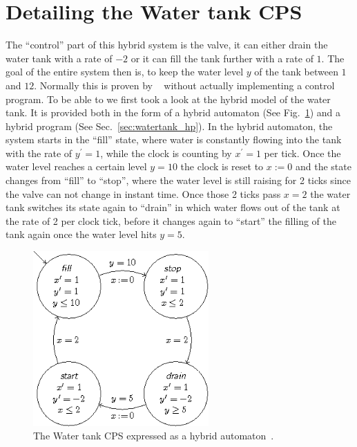 \section{Detailing the Water tank CPS}
\label{sec:watertank:detail}

The ``control'' part of this hybrid system is the valve, it can either drain the water tank with a rate of \(-2\) or it can fill the tank further with a rate of \(1\). The goal of the entire system then is, to keep the water level \(y\) of the tank between \(1\) and \(12\). Normally this is proven by \keym~ without actually implementing a control program. To be able to we first took a look at the hybrid model of the water tank. It is provided both in the form of a hybrid automaton (See Fig.~\ref{fig:watertank_ha}) and a hybrid program (See Sec.~\ref{sec:watertank_hp}). In the hybrid automaton, the system starts in the ``fill'' state, where water is constantly flowing into the tank with the rate of \(y^{\prime} = 1\), while the clock is counting by \(x^{\prime}=1\) per tick. Once the water level reaches a certain level \(y=10\) the clock is reset to \(x:=0\) and the state changes from ``fill'' to ``stop'', where the water level is still raising for 2 ticks since the valve can not change in instant time. Once those 2 ticks pass \(x=2\) the water tank switches its state again to ``drain'' in which water flows out of the tank at the rate of 2 per clock tick, before it changes again to ``start'' the filling of the tank again once the water level hits \(y=5\).
\begin{figure}
	\centering
	\includegraphics[width=0.6\textwidth]{images/watertank_ha}
	\caption{The Water tank CPS expressed as a hybrid automaton~\cite{keymaeraGuide}.}
	\label{fig:watertank_ha}
\end{figure}

